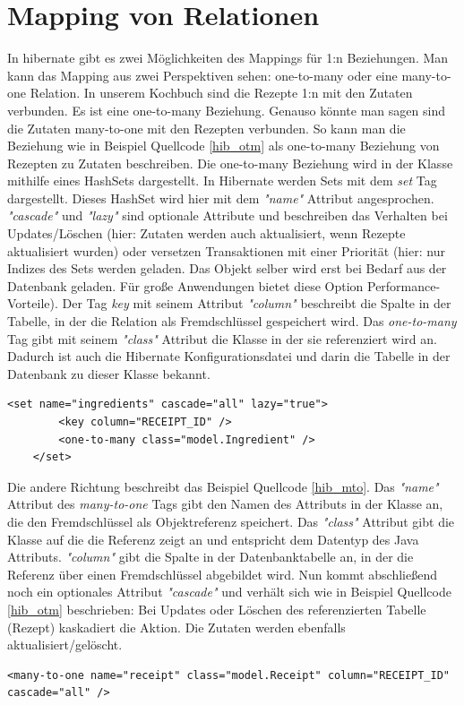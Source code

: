 \section{Mapping von Relationen}
In \gls{hibernate} gibt es zwei Möglichkeiten des Mappings für 1:n Beziehungen. Man kann das Mapping aus zwei Perspektiven sehen: one-to-many oder eine many-to-one Relation. In unserem Kochbuch sind die Rezepte 1:n mit den Zutaten verbunden. Es ist eine one-to-many Beziehung. Genauso könnte man sagen sind die Zutaten many-to-one mit den Rezepten verbunden.
So kann man die Beziehung wie in Beispiel Quellcode \ref{hib_otm} als one-to-many Beziehung von Rezepten zu Zutaten beschreiben. Die one-to-many Beziehung wird in der Klasse mithilfe eines HashSets dargestellt. In Hibernate werden Sets mit dem \textit{set} Tag dargestellt. Dieses HashSet wird hier mit dem \textit{"name"} Attribut angesprochen. \textit{"cascade"} und \textit{"lazy"} sind optionale Attribute und beschreiben das Verhalten bei Updates/Löschen (hier: Zutaten werden auch aktualisiert, wenn Rezepte aktualisiert wurden) oder versetzen Transaktionen mit einer Priorität (hier: nur Indizes des Sets werden geladen. Das Objekt selber wird erst bei Bedarf aus der Datenbank geladen. Für große Anwendungen bietet diese Option Performance-Vorteile).
Der Tag \textit{key} mit seinem Attribut \textit{"column"} beschreibt die Spalte in der Tabelle, in der die Relation als Fremdschlüssel gespeichert wird. Das \textit{one-to-many} Tag gibt mit seinem \textit{"class"} Attribut die Klasse in der sie referenziert wird an. Dadurch ist auch die Hibernate Konfigurationsdatei und darin die Tabelle in der Datenbank zu dieser Klasse bekannt.
\begin{lstlisting}[caption={One-To-Many Beziehung von Rezepten zu Zutaten},label=hib_otm]
    <set name="ingredients" cascade="all" lazy="true">
		<key column="RECEIPT_ID" />
		<one-to-many class="model.Ingredient" />
	</set>
\end{lstlisting}
Die andere Richtung beschreibt das Beispiel Quellcode \ref{hib_mto}. Das \textit{"name"} Attribut des \textit{many-to-one} Tags gibt den Namen des Attributs in der Klasse an, die den Fremdschlüssel als Objektreferenz speichert. Das \textit{"class"} Attribut gibt die Klasse auf die die Referenz zeigt an und entspricht dem Datentyp des Java Attributs. \textit{"column"} gibt die Spalte in der Datenbanktabelle an, in der die Referenz über einen Fremdschlüssel abgebildet wird. Nun kommt abschließend noch ein optionales Attribut \textit{"cascade"} und verhält sich wie in Beispiel Quellcode \ref{hib_otm} beschrieben: Bei Updates oder Löschen des referenzierten Tabelle (Rezept) kaskadiert die Aktion. Die Zutaten werden ebenfalls aktualisiert/gelöscht.
\begin{lstlisting}[caption={Many-To-One Beziehung von Zutaten zu Rezepten},label=hib_mto]
    <many-to-one name="receipt" class="model.Receipt" column="RECEIPT_ID" cascade="all" />
\end{lstlisting}

